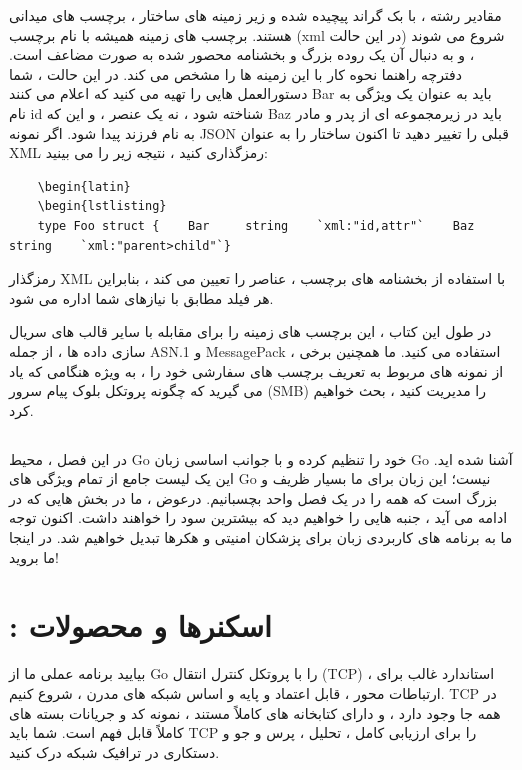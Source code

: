 \documentclass[12pt]{book}
\begin{document}
مقادیر رشته ، با بک گراند پیچیده شده و زیر زمینه های ساختار ، برچسب های میدانی هستند. برچسب های زمینه همیشه با نام برچسب (xml در این حالت) شروع می شوند ، و به دنبال آن یک روده بزرگ و بخشنامه محصور شده به صورت مضاعف است. دفترچه راهنما نحوه کار با این زمینه ها را مشخص می کند. در این حالت ، شما دستورالعمل هایی را تهیه می کنید که اعلام می کنند Bar باید به عنوان یک ویژگی به نام id شناخته شود ، نه یک عنصر ، و این که Baz باید در زیرمجموعه ای از پدر و مادر به نام فرزند پیدا شود. اگر نمونه JSON قبلی را تغییر دهید تا اکنون ساختار را به عنوان XML رمزگذاری کنید ، نتیجه زیر را می بینید:
\begin{latin}
	\begin{lstlisting}
	\begin{latin}
	\begin{lstlisting}
	type Foo struct {    Bar     string    `xml:"id,attr"`    Baz     string    `xml:"parent>child"`}
	\end{lstlisting}
\end{latin}

رمزگذار XML با استفاده از بخشنامه های برچسب ، عناصر را تعیین می کند ، بنابراین هر فیلد مطابق با نیازهای شما اداره می شود.

در طول این کتاب ، این برچسب های زمینه را برای مقابله با سایر قالب های سریال سازی داده ها ، از جمله ASN.1 و MessagePack ، استفاده می کنید. ما همچنین برخی از نمونه های مربوط به تعریف برچسب های سفارشی خود را ، به ویژه هنگامی که یاد می گیرید که چگونه پروتکل بلوک پیام سرور (SMB) را مدیریت کنید ، بحث خواهیم کرد.
\section{}
در این فصل ، محیط Go خود را تنظیم کرده و با جوانب اساسی زبان Go آشنا شده اید. این یک لیست جامع از تمام ویژگی های Go نیست؛ این زبان برای ما بسیار ظریف و بزرگ است که همه را در یک فصل واحد بچسبانیم. درعوض ، ما در بخش هایی که در ادامه می آید ، جنبه هایی را خواهیم دید که بیشترین سود را خواهند داشت. اکنون توجه ما به برنامه های کاربردی زبان برای پزشکان امنیتی و هکرها تبدیل خواهیم شد. در اینجا ما بروید!
\chapter{: اسکنرها و محصولات}
بیایید برنامه عملی ما از Go را با پروتکل کنترل انتقال (TCP) ، استاندارد غالب برای ارتباطات محور ، قابل اعتماد و پایه و اساس شبکه های مدرن ، شروع کنیم. TCP در همه جا وجود دارد ، و دارای کتابخانه های کاملاً مستند ، نمونه کد و جریانات بسته های کاملاً قابل فهم است. شما باید TCP را برای ارزیابی کامل ، تحلیل ، پرس و جو و دستکاری در ترافیک شبکه درک کنید.
\end{document}

